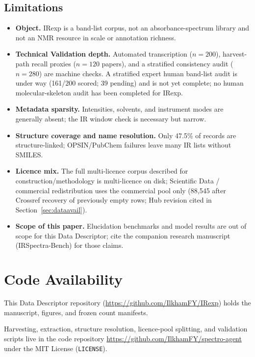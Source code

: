 \documentclass[pdflatex,sn-nature]{sn-jnl}
\begin{document}
\subsection{Limitations}\label{sec:limitations}

\begin{itemize}
  \item \textbf{Object.} IRexp is a band-list corpus, not an absorbance-spectrum
        library and not an NMR resource in scale or annotation richness.
  \item \textbf{Technical Validation depth.} Automated transcription ($n=200$),
        harvest-path recall proxies ($n=120$ papers), and a stratified consistency
        audit ($n=280$) are machine checks. A stratified expert human band-list
        audit is under way (161/200 scored; 39 pending) and is not yet complete;
        no human molecular-skeleton audit has been completed for IRexp.
  \item \textbf{Metadata sparsity.} Intensities, solvents, and instrument modes are
        generally absent; the IR window check is necessary but narrow.
  \item \textbf{Structure coverage and name resolution.} Only 47.5\% of records are
        structure-linked; OPSIN/PubChem failures leave many IR lists without SMILES.
  \item \textbf{Licence mix.} The full multi-licence corpus described for
        construction/methodology is multi-licence on disk; Scientific Data /
        commercial redistribution uses the commercial pool only (88,545 after
        Crossref recovery of previously empty rows; Hub revision cited in
        Section~\ref{sec:dataavail}).
  \item \textbf{Scope of this paper.} Elucidation benchmarks and model results are
        out of scope for this Data Descriptor; cite the companion research manuscript
        (IRSpectra-Bench) for those claims.
\end{itemize}

\section{Code Availability}\label{sec:codeavail}

This Data Descriptor repository (\url{https://github.com/IlkhamFY/IRexp}) holds
the manuscript, figures, and frozen count manifests.

Harvesting, extraction, structure resolution, licence-pool splitting, and
validation scripts live in the code repository
\url{https://github.com/IlkhamFY/spectro-agent} under the MIT License
(\texttt{LICENSE}).
\end{document}
